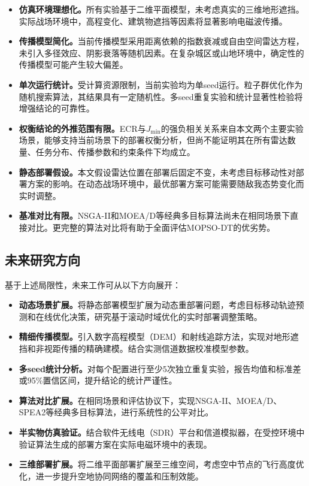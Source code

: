 \begin{itemize}
    \item \textbf{仿真环境理想化。}所有实验基于二维平面模型，未考虑真实的三维地形遮挡。实际战场环境中，高程变化、建筑物遮挡等因素将显著影响电磁波传播。

    \item \textbf{传播模型简化。}当前传播模型采用距离依赖的指数衰减或自由空间雷达方程，未引入多径效应、阴影衰落等随机因素。在复杂城区或山地环境中，确定性的传播模型可能产生较大偏差。

    \item \textbf{单次运行统计。}受计算资源限制，当前实验均为单seed运行。粒子群优化作为随机搜索算法，其结果具有一定随机性。多seed重复实验和统计显著性检验将增强结论的可靠性。

    \item \textbf{权衡结论的外推范围有限。}ECR与$J_{\min}$的强负相关关系来自本文两个主要实验场景，能够支持当前场景下的部署权衡分析，但尚不能证明其在所有雷达数量、任务分布、传播参数和约束条件下均成立。

    \item \textbf{静态部署假设。}本文假设雷达位置在部署后固定不变，未考虑目标移动性对部署方案的影响。在动态战场环境中，最优部署方案可能需要随敌我态势变化而实时调整。

    \item \textbf{基准对比有限。}NSGA-II和MOEA/D等经典多目标算法尚未在相同场景下直接对比。更完整的算法对比将有助于全面评估MOPSO-DT的优劣势。
\end{itemize}

\subsection{未来研究方向}

基于上述局限性，未来工作可从以下方向展开：

\begin{itemize}
    \item \textbf{动态场景扩展。}将静态部署模型扩展为动态重部署问题，考虑目标移动轨迹预测和在线优化决策，研究基于滚动时域优化的实时部署调整策略。

    \item \textbf{精细传播模型。}引入数字高程模型（DEM）和射线追踪方法，实现对地形遮挡和非视距传播的精确建模。结合实测信道数据校准模型参数。

    \item \textbf{多seed统计分析。}对每个配置进行至少5次独立重复实验，报告均值和标准差或95\%置信区间，提升结论的统计严谨性。

    \item \textbf{算法对比扩展。}在相同场景和评估协议下，实现NSGA-II、MOEA/D、SPEA2等经典多目标算法，进行系统性的公平对比。

    \item \textbf{半实物仿真验证。}结合软件无线电（SDR）平台和信道模拟器，在受控环境中验证算法生成的部署方案在实际电磁环境中的表现。

    \item \textbf{三维部署扩展。}将二维平面部署扩展至三维空间，考虑空中节点的飞行高度优化，进一步提升空地协同网络的覆盖和压制效能。
\end{itemize}
